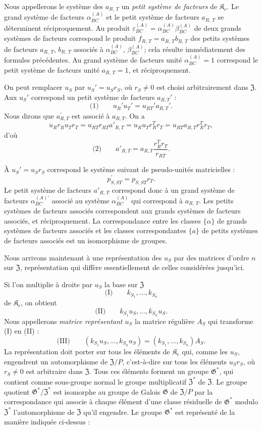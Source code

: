 Nous appellerons le système des \(a_{R,\,T}\) un \emph{petit système de facteurs} de \(\mathfrak K_r\). Le grand système de facteurs \(\alpha_{BC}^{(A)}\) et le petit système de facteurs \(a_{R,\,T}\) se déterminent réciproquement. Au produit \(\varepsilon_{BC}^{(A)} = \alpha_{BC}^{(A)} \beta_{BC}^{(A)}\) de deux grands systèmes de facteurs correspond le produit \(f_{R,\,T} = a_{R,\,T}b_{R,\,T}\) des petits systèmes de facteurs \(a_{R,\,T}\), \(b_{R,\,T}\) associés à \(\alpha_{BC}^{(A)}\), \(\beta_{BC}^{(A)}\); cela résulte immédiatement des formules précédentes. Au grand système de facteurs unité \(\alpha_{BC}^{(A)} = 1\) correspond le petit système de facteurs unité \(a_{R,\,T} = 1\), et réciproquement.

On peut remplacer \(u_S\) par \(u_S'=u_Sr_S\), où \(r_S\neq 0\) est choisi arbitrairement dans \(\mathfrak Z\). Aux \(u_S'\) correspond un petit système de facteurs \(a_{R,T}'\) :
\[
\text{(1)}\qquad u_R'u_T'=u_{RT}'a_{R,T}'.
\]
Nous dirons que \(a_{R,T}^{\prime}\) est associé à \(a_{R,T}\). On a
\[
u_R r_R u_T r_T = u_{RT} r_{RT} a'_{R,T} = u_R u_T r_R^T r_T = u_{RT} a_{R,T} r_R^T r_T,
\]
d'où
\[
\text{(2)}\qquad a'_{R,T}=a_{R,T}\frac{r_R^T r_T}{r_{RT}}.
\]

À \(u_S' = u_S r_S\) correspond le système suivant de pseudo-unités matricielles :
\[
p_{S,ST}^{\prime}=p_{S,ST}r_{T}.
\]
Le petit système de facteurs \(a'_{R,\,T}\) correspond donc à un grand système de facteurs \(\alpha^{(A)\prime}_{BC}\) associé au système \(\alpha^{(A)}_{BC}\) qui correspond à \(a_{R,\,T}\). Les petits systèmes de facteurs associés correspondent aux grands systèmes de facteurs associés, et réciproquement. La correspondance entre les classes \(\{\alpha\}\) de grands systèmes de facteurs associés et les classes correspondantes \(\{a\}\) de petits systèmes de facteurs associés est un isomorphisme de groupes.

Nous arrivons maintenant à une représentation des \(u_S\) par des matrices d'ordre \(n\) sur \(\mathfrak Z\), représentation qui diffère essentiellement de celles considérées jusqu'ici.

Si l'on multiplie à droite par \(u_S\) la base sur \(\mathfrak Z\)
\[
\text{(I)}\qquad k_{S_1}, \ldots, k_{S_n}
\]
de \(\mathfrak K_r\), on obtient
\[
\text{(II)}\qquad k_{S_1}u_S, \ldots, k_{S_n}u_S.
\]
Nous appellerons \emph{matrice représentant \(u_S\)} la matrice régulière \(A_S\) qui transforme (I) en (II) :
\[
\text{(III)}\qquad (k_{S_1}u_S, \ldots, k_{S_n}u_S) = (k_{S_1}, \ldots, k_{S_n})A_S.
\]
La représentation doit porter sur tous les éléments de \(\mathfrak K_r\) qui, comme les \(u_S\), engendrent un automorphisme de \(\mathfrak Z/P\), c'est-à-dire sur tous les éléments \(u_Sr_S\), où \(r_S \neq 0\) est arbitraire dans \(\mathfrak Z\). Tous ces éléments forment un groupe \(\mathfrak G^*\), qui contient comme sous-groupe normal le groupe multiplicatif \(\mathfrak Z^*\) de \(\mathfrak Z\). Le groupe quotient \(\mathfrak G^*/\mathfrak Z^*\) est isomorphe au groupe de Galois \(\mathfrak G\) de \(\mathfrak Z/P\) par la correspondance qui associe à chaque élément d'une classe résiduelle de \(\mathfrak G^*\) modulo \(\mathfrak Z^*\) l'automorphisme de \(\mathfrak Z\) qu'il engendre. Le groupe \(\mathfrak G^*\) est représenté de la manière indiquée ci-dessus :

